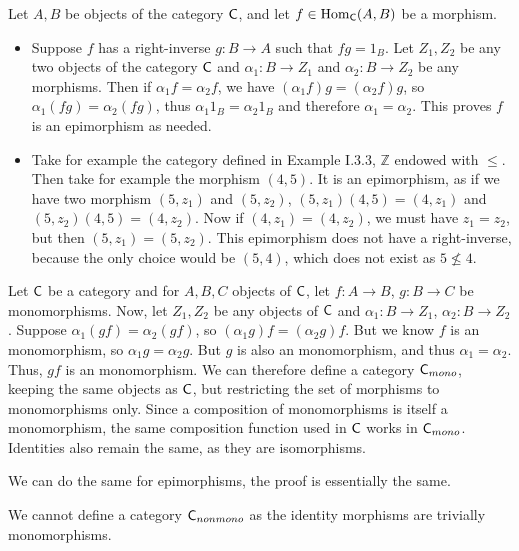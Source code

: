 \begin{solution}
	Let $A, B$ be objects of the category $\mathsf{C}$, and let $f \in \mathrm{Hom}_{\mathsf{C}}(A, B)$ be a morphism.
	\begin{itemize}
		\item Suppose $f$ has a right-inverse $g: B \to A$ such that $fg = 1_B$. Let $Z_1, Z_2$ be any two objects of the category $\mathsf{C}$ and $\alpha_1: B \to Z_1$ and $\alpha_2: B \to Z_2$ be any morphisms. Then if $\alpha_1 f = \alpha_2 f$, we have $(\alpha_1 f) g = (\alpha_2 f) g$, so $\alpha_1 (fg) = \alpha_2 (fg)$, thus $\alpha_1 1_B = \alpha_2 1_B$ and therefore $\alpha_1 = \alpha_2$. This proves $f$ is an epimorphism as needed.
		\item Take for example the category defined in Example I.3.3, $\mathbb{Z}$ endowed with $\leq$. Then take for example the morphism $(4,5)$. It is an epimorphism, as if we have two morphism $(5, z_1)$ and $(5, z_2)$, $(5, z_1)(4,5)=(4, z_1)$ and $(5, z_2)(4,5)=(4,z_2)$. Now if $(4,z_1)=(4,z_2)$, we must have $z_1 = z_2$, but then $(5,z_1)=(5,z_2)$. This epimorphism does not have a right-inverse, because the only choice would be $(5,4)$, which does not exist as $5 \not \leq 4$.
	\end{itemize}
\end{solution}

\begin{problem}
\end{problem}

\begin{solution}
	Let $\mathsf{C}$ be a category and for $A,B,C$ objects of $\mathsf{C}$, let $f: A \to B$, $g: B \to C$ be monomorphisms. Now, let $Z_1, Z_2$ be any objects of $\mathsf{C}$ and $\alpha_1: B \to Z_1$, $\alpha_2: B \to Z_2$. Suppose $\alpha_1 (gf) = \alpha_2 (gf)$, so $(\alpha_1 g)f = (\alpha_2 g)f$. But we know $f$ is an monomorphism, so $\alpha_1 g = \alpha_2 g$. But $g$ is also an monomorphism, and thus $\alpha_1 = \alpha_2$. Thus, $gf$ is an monomorphism. We can therefore define a category $\mathsf{C}_{mono}$, keeping the same objects as $\mathsf{C}$, but restricting the set of morphisms to monomorphisms only. Since a composition of monomorphisms is itself a monomorphism, the same composition function used in $\mathsf{C}$ works in $\mathsf{C}_{mono}$. Identities also remain the same, as they are isomorphisms.
	
	We can do the same for epimorphisms, the proof is essentially the same.
	
	We cannot define a category $\mathsf{C}_{nonmono}$ as the identity morphisms are trivially monomorphisms.
\end{solution}

